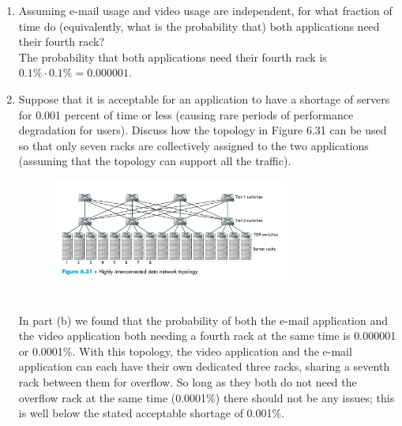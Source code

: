 \documentclass[12pt]{article}
\begin{document}
\begin{enumerate}
\begin{enumerate}
        \item Assuming e-mail usage and video usage are independent, for what fraction of time do (equivalently, what is the probability that) both applications need their fourth rack?\\[1em]
        The probability that both applications need their fourth rack is \(0.1\% \cdot 0.1\% = 0.000001\).
        \item Suppose that it is acceptable for an application to have a shortage of servers for 0.001 percent of time or less (causing rare periods of performance degradation for users). Discuss how the topology in Figure 6.31 can be used so that only seven racks are collectively assigned to the two applications (assuming that the topology can support all the traffic).
        \begin{figure}[h!]
            \centering
            \includegraphics[width=0.75\textwidth]{Fig6.31.png}
        \end{figure}\\[1em]
        In part (b) we found that the probability of both the e-mail application and the video application both needing a fourth rack at the same time is 0.000001 or 0.0001\%. With this topology, the video application and the e-mail application can each have their own dedicated three racks, sharing a seventh rack between them for overflow. So long as they both do not need the overflow rack at the same time (0.0001\%) there should not be any issues; this is well below the stated acceptable shortage of 0.001\%.
    \end{enumerate}
\end{enumerate}
\end{document}
